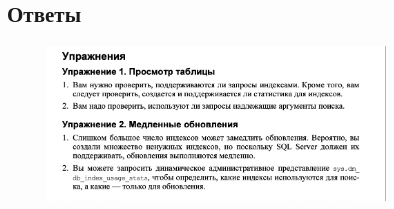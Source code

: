 \subsection*{Ответы}

\begin{figure}[h!]
	\begin{center}
		\includegraphics[width=0.8\textwidth]{img/eans19.png}
	\end{center}
	\captionsetup{justification=centering}
\end{figure}